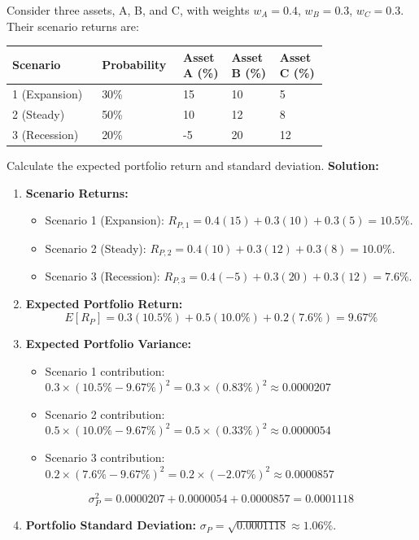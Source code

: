 \begin{tcolorbox}[
	colback=gray!5!white,
	colframe=black!15!white,
	boxrule=0.5pt,
	arc=3pt,
	title=\textbf{Example 6: Expected Portfolio Returns and Scenarios},
	coltitle=black,
	colbacktitle=black!5!white,
	before skip=6pt,
	after skip=6pt,
	breakable
]
Consider three assets, A, B, and C, with weights $w_A = 0.4$, $w_B = 0.3$, $w_C = 0.3$. Their scenario returns are:
\begin{center}
\begin{tabular}{p{0.25\linewidth}  p{0.13\linewidth}  p{0.13\linewidth}  p{0.13\linewidth}  p{0.13\linewidth}}
	\toprule
	\textbf{Scenario} & \textbf{Probability} & \textbf{Asset A (\%)} & \textbf{Asset B (\%)} & \textbf{Asset C (\%)} \\
	\midrule
	1 (Expansion) & 30\% & 15 & 10 & 5 \\
	2 (Steady) & 50\% & 10 & 12 & 8 \\
	3 (Recession) & 20\% & -5 & 20 & 12 \\
	\bottomrule
\end{tabular}
\end{center}
Calculate the expected portfolio return and standard deviation.
\textbf{Solution:}
\begin{enumerate}
	\item \textbf{Scenario Returns:}
	      \begin{itemize}
		      \item Scenario 1 (Expansion): $R_{P,1} = 0.4(15) + 0.3(10) + 0.3(5) = 10.5\%$.
		      \item Scenario 2 (Steady): $R_{P,2} = 0.4(10) + 0.3(12) + 0.3(8) = 10.0\%$.
		      \item Scenario 3 (Recession): $R_{P,3} = 0.4(-5) + 0.3(20) + 0.3(12) = 7.6\%$.
	      \end{itemize}
	\item \textbf{Expected Portfolio Return:}
	      \[
	      E[R_P] = 0.3(10.5\%) + 0.5(10.0\%) + 0.2(7.6\%) = 9.67\%
	      \]
	\item \textbf{Expected Portfolio Variance:}
	      \begin{itemize}
		      \item Scenario 1 contribution: $0.3 \times (10.5\% - 9.67\%)^2 = 0.3 \times (0.83\%)^2 \approx 0.0000207$
		      \item Scenario 2 contribution: $0.5 \times (10.0\% - 9.67\%)^2 = 0.5 \times (0.33\%)^2 \approx 0.0000054$
		      \item Scenario 3 contribution: $0.2 \times (7.6\% - 9.67\%)^2 = 0.2 \times (-2.07\%)^2 \approx 0.0000857$
	      \end{itemize}
	      \[
	      \sigma_P^2 = 0.0000207 + 0.0000054 + 0.0000857 = 0.0001118
	      \]
	\item \textbf{Portfolio Standard Deviation:} $\sigma_P = \sqrt{0.0001118} \approx 1.06\%$.
\end{enumerate}
\end{tcolorbox}
